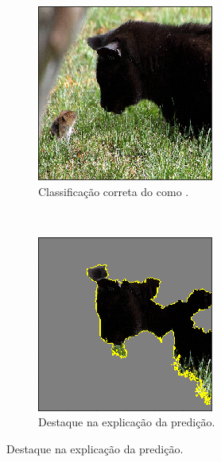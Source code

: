 \begin{figure}[H]
    \centering
    \caption{Exemplo de saída gerado pelo LIME em situação correta.}
    \label{project:fig:explain:lime2}
    \begin{subfigure}[t]{0.5\textwidth}
        \centering
        \includegraphics[width=1\linewidth]{recursos/imagens/project/gato.png}
        \caption{Classificação correta do  como .}
        \label{project:fig:explain:lime2.1}
    \end{subfigure}%
    ~
    \begin{subfigure}[t]{0.5\textwidth}
        \centering
        \includegraphics[width=1\linewidth]{recursos/imagens/project/mascara_gato.png}
        \caption{Destaque na explicação da predição.}
        \label{project:fig:explain:lime2.2}
    \end{subfigure}%


\end{figure}
